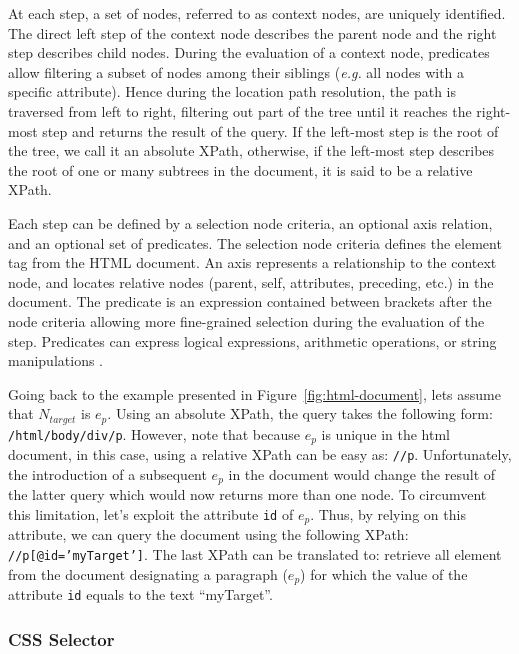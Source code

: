 At each step, a set of nodes, referred to as context nodes, are uniquely identified. The direct left step of the context node describes the parent node and the right step describes child nodes. During the evaluation of a context node, predicates allow filtering a subset of nodes among their siblings (\emph{e.g.} all nodes with a specific attribute). Hence during the location path resolution, the path is traversed from left to right, filtering out part of the tree until it reaches the right-most step and returns the result of the query. If the left-most step is the root of the tree, we call it an absolute XPath, otherwise, if the left-most step describes the root of one or many subtrees in the document, it is said to be a relative XPath. 

Each step can be defined by a selection node criteria, an optional axis relation, and an optional set of predicates\cite{Barton2003}. The selection node criteria defines the element tag from the HTML document. An axis represents a relationship to the context node, and locates relative nodes (parent, self, attributes, preceding, etc.) in the document. The predicate is an expression contained between brackets after the node criteria allowing more fine-grained selection during the evaluation of the step. Predicates can express logical expressions, arithmetic operations, or string manipulations \cite{Gottlob2005}.

Going back to the example presented in Figure~\ref{fig:html-document}, lets assume that $N_{target}$ is $e_{p}$. Using an absolute XPath, the query takes the following form: \texttt{/html/body/div/p}. However, note that because $e_p$ is unique in the \gls{html} document, in this case, using a relative XPath can be easy as: \texttt{//p}. Unfortunately, the introduction of a subsequent $e_p$ in the document would change the result of the latter query which would now returns more than one node. To circumvent this limitation, let's exploit the  attribute \texttt{id} of $e_p$. Thus, by relying on this attribute, we can query the document using the following XPath: \texttt{//p[@id='myTarget']}. The last XPath can be translated to: retrieve all element from the document designating a paragraph ($e_p$) for which the value of the attribute \texttt{id} equals to the text ``myTarget''.

\subsubsection{CSS Selector}
\label{sec:hpath-introduction-css-selector}

